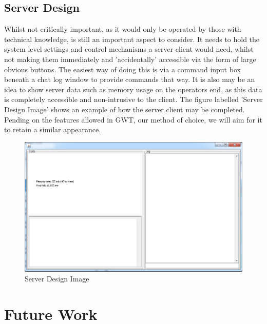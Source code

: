 \subsection{Server Design}
Whilst not critically important, as it would only be operated by those with 
technical knowledge, is still an important aspect to consider. It needs to hold 
the system level settings and control mechanisms a server client would need, 
whilst not making them immediately and 'accidentally' accessible via the form of 
large obvious buttons. The easiest way of doing this is via a command input box 
beneath a chat log window to provide commands that way. It is also may be an 
idea to show server data such as memory usage on the operators end, as this data 
is completely accessible and non-intrusive to the client. The figure labelled 
'Server Design Image' shows an example of how the server client may be completed.
Pending on the features allowed in GWT, our method of choice, we will aim for 
it to retain a similar appearance.   

\begin{figure}[H]
    \centering
    \includegraphics[width=\textwidth]{images/design/server.jpg}
    \caption{Server Design Image}
    \label{fig:server}
\end{figure}

\section{Future Work}

